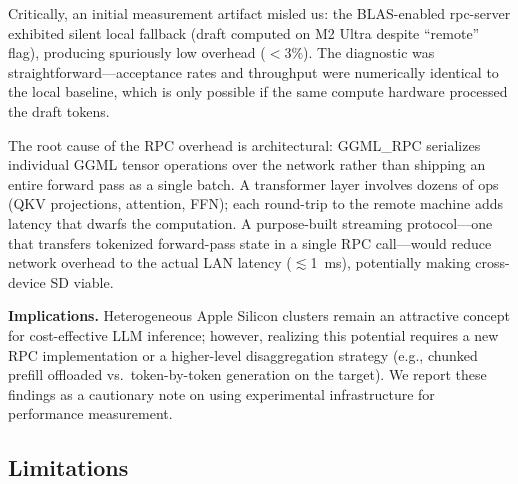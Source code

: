 \documentclass[11pt,a4paper]{article}
\begin{document}
Critically, an initial measurement artifact misled us: the BLAS-enabled rpc-server
exhibited silent local fallback (draft computed on M2 Ultra despite ``remote''
flag), producing spuriously low overhead ($<3\%$).
The diagnostic was straightforward---acceptance rates and throughput were
numerically identical to the local baseline, which is only possible if the same
compute hardware processed the draft tokens.

The root cause of the RPC overhead is architectural: GGML\_RPC serializes
individual GGML tensor operations over the network rather than shipping an entire
forward pass as a single batch.
A transformer layer involves dozens of ops (QKV projections, attention, FFN);
each round-trip to the remote machine adds latency that dwarfs the computation.
A purpose-built streaming protocol---one that transfers tokenized forward-pass
state in a single RPC call---would reduce network overhead to the actual LAN
latency ($\lesssim$1~ms), potentially making cross-device SD viable.

\textbf{Implications.} Heterogeneous Apple Silicon clusters remain an attractive
concept for cost-effective LLM inference; however, realizing this potential
requires a new RPC implementation or a higher-level disaggregation strategy
(e.g., chunked prefill offloaded vs.\ token-by-token generation on the target).
We report these findings as a cautionary note on using experimental infrastructure
for performance measurement.

\subsection{Limitations}
\end{document}
